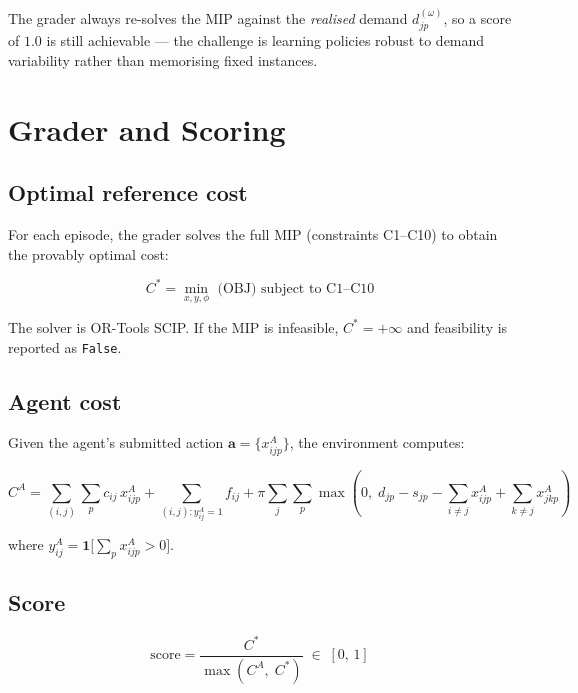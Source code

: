 \documentclass[11pt, a4paper]{article}
\begin{document}
The grader always re-solves the MIP against the \emph{realised} demand
$d_{jp}^{(\omega)}$, so a score of $1.0$ is still achievable — the
challenge is learning policies robust to demand variability rather than
memorising fixed instances.

\section{Grader and Scoring}

\subsection{Optimal reference cost}

For each episode, the grader solves the full MIP (constraints
C1--C10) to obtain the provably optimal cost:

\begin{equation}
  C^* = \min_{x,y,\phi} \text{ (OBJ) subject to C1--C10}
\end{equation}

The solver is OR-Tools SCIP.  If the MIP is infeasible,
$C^* = +\infty$ and feasibility is reported as \texttt{False}.

\subsection{Agent cost}

Given the agent's submitted action
$\mathbf{a} = \{x_{ijp}^{A}\}$, the environment computes:

\begin{equation}
  C^A
  = \sum_{(i,j)}\sum_{p} c_{ij}\, x_{ijp}^{A}
  + \sum_{(i,j) : y_{ij}^A = 1} f_{ij}
  + \pi \sum_{j}\sum_{p}
      \max\!\left(0,\; d_{jp} - s_{jp}
                 - \sum_{i \neq j} x_{ijp}^A
                 + \sum_{k \neq j} x_{jkp}^A\right)
\end{equation}

where $y_{ij}^A = \mathbf{1}\bigl[\sum_p x_{ijp}^A > 0\bigr]$.

\subsection{Score}

\begin{equation}
  \boxed{
    \text{score}
    = \frac{C^*}{\max\!\left(C^A,\; C^*\right)}
    \;\in\; [0,\, 1]
  }
  \label{eq:score}
\end{equation}
\end{document}
